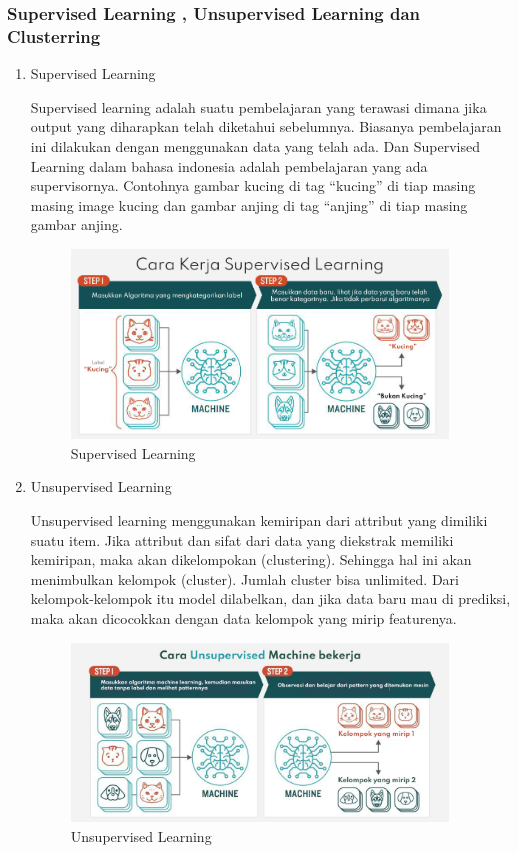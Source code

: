\subsubsection{Supervised Learning , Unsupervised Learning dan Clusterring}

\begin{enumerate}
\item Supervised Learning

Supervised learning adalah suatu pembelajaran yang terawasi dimana jika output yang diharapkan telah diketahui sebelumnya. Biasanya pembelajaran ini dilakukan dengan menggunakan data yang telah ada.
Dan Supervised Learning dalam bahasa indonesia adalah pembelajaran yang ada supervisornya. Contohnya gambar kucing di tag “kucing” di tiap masing masing image kucing dan gambar anjing di tag “anjing” di tiap masing gambar anjing.
\begin{figure}[H]
\centerline{\includegraphics[width=10cm]{figures/1174057/chapter2/2.jpg}}
\caption{Supervised Learning}
\label{labelgambar}
\end{figure}

\item Unsupervised Learning

Unsupervised learning menggunakan kemiripan dari attribut yang dimiliki suatu item. Jika attribut dan sifat dari data yang diekstrak memiliki kemiripan, maka akan dikelompokan (clustering). Sehingga hal ini akan menimbulkan kelompok (cluster). Jumlah cluster bisa unlimited. Dari kelompok-kelompok itu model dilabelkan, dan jika data baru mau di prediksi, maka akan dicocokkan dengan data kelompok yang mirip featurenya.
\begin{figure}[H]
\centerline{\includegraphics[width=10cm]{figures/1174057/chapter2/3.jpg}}
\caption{Unsupervised Learning}
\label{labelgambar}
\end{figure}


\end{enumerate}
